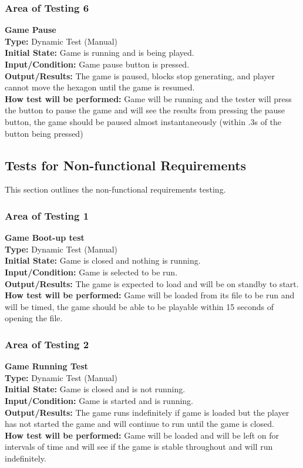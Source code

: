 \documentclass[12pt, titlepage]{article}
\begin{document}
\subsubsection{Area of Testing 6}
\noindent \textbf{Game Pause} \\
\textbf{Type:} Dynamic Test (Manual) \\
\textbf{Initial State:} Game is running and is being played.\\
\textbf{Input/Condition:} Game pause button is pressed. \\ 
\textbf{Output/Results:} The game is paused, blocks stop generating, and player cannot move the hexagon until the game is resumed.\\
\textbf{How test will be performed:} Game will be running and the tester will press the button to pause the game and will see the results from pressing the pause button, the game should be paused almost instantaneously (within .3s of the button being pressed)


\subsection{Tests for Non-functional Requirements}
\noindent This section outlines the non-functional requirements testing.
\subsubsection{Area of Testing 1}
\noindent \textbf{Game Boot-up test}  \\
\textbf{Type:} Dynamic Test (Manual) \\
\textbf{Initial State:} Game is closed and nothing is running.\\
\textbf{Input/Condition:} Game is selected to be run.\\
\textbf{Output/Results:} The game is expected to load and will be on standby to start. \\
\textbf{How test will be performed:} Game will be loaded from its file to be run and will be timed, the game should be able to be playable within 15 seconds of opening the file.

\subsubsection{Area of Testing 2}
\noindent \textbf{Game Running Test} \\
\textbf{Type:} Dynamic Test (Manual) \\
\textbf{Initial State:} Game is closed and is not running. \\
\textbf{Input/Condition:} Game is started and is running. \\
\textbf{Output/Results:} The game runs indefinitely if game is loaded but the player has not started the game and will continue to run until the game is closed. \\
\textbf{How test will be performed:} Game will be loaded and will be left on for intervals of time and will see if the game is stable throughout and will run indefinitely. 
\end{document}
